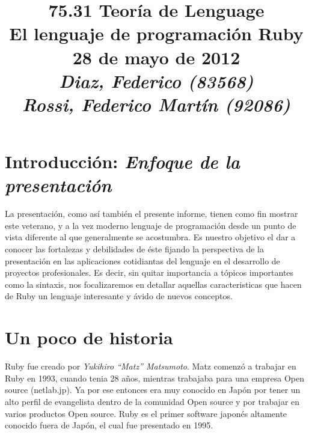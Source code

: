 \documentclass{article}
\begin{document}
\title{\huge 75.31 Teoría de Lenguage \\ 
	  \Huge El lenguaje de programación Ruby \\
	  \bigskip \Large 28 de mayo de 2012 \\
	  \bigskip\bigskip \large\textit{Diaz, Federico (83568)\\Rossi, Federico Martín (92086)}}
\date{}
\maketitle




\section{Introducción: \textit{Enfoque de la presentación}}

La presentación, como así también el presente informe, tienen como fin mostrar este veterano, y a la vez moderno lenguaje de programación desde un punto de vista diferente al que generalmente se acostumbra. Es nuestro objetivo el dar a conocer las fortalezas y debilidades de éste fijando la perspectiva de la presentación en las aplicaciones cotidiantas del lenguaje en el desarrollo de proyectos profesionales. Es decir, sin quitar importancia a tópicos importantes como la sintaxis, nos focalizaremos en detallar aquellas caracteristicas que hacen de Ruby un lenguaje interesante y ávido de nuevos conceptos.
\bigskip




\section{Un poco de historia}

Ruby fue creado por \textit{Yukihiro ``Matz'' Matsumoto}. Matz comenzó a trabajar en Ruby en 1993, cuando tenia 28 años, mientras trabajaba para una empresa Open source (netlab.jp). Ya por ese entonces era muy conocido en Japón por tener un alto perfil de evangelista dentro de la comunidad Open source y por trabajar en varios productos Open source. Ruby es el primer software japonés altamente conocido fuera de Japón, el cual fue presentado en 1995.
\end{document}
